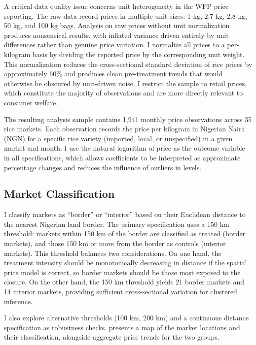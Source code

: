\documentclass[12pt]{article}
\begin{document}
A critical data quality issue concerns unit heterogeneity in the WFP price reporting. The raw data record prices in multiple unit sizes: 1 kg, 2.7 kg, 2.8 kg, 50 kg, and 100 kg bags. Analysis on raw prices without unit normalization produces nonsensical results, with inflated variance driven entirely by unit differences rather than genuine price variation. I normalize all prices to a per-kilogram basis by dividing the reported price by the corresponding unit weight. This normalization reduces the cross-sectional standard deviation of rice prices by approximately 60\% and produces clean pre-treatment trends that would otherwise be obscured by unit-driven noise. I restrict the sample to retail prices, which constitute the majority of observations and are more directly relevant to consumer welfare.

The resulting analysis sample contains 1,941 monthly price observations across 35 rice markets. Each observation records the price per kilogram in Nigerian Naira (NGN) for a specific rice variety (imported, local, or unspecified) in a given market and month. I use the natural logarithm of price as the outcome variable in all specifications, which allows coefficients to be interpreted as approximate percentage changes and reduces the influence of outliers in levels.

\subsection{Market Classification}

I classify markets as ``border'' or ``interior'' based on their Euclidean distance to the nearest Nigerian land border. The primary specification uses a 150 km threshold: markets within 150 km of the border are classified as treated (border markets), and those 150 km or more from the border as controls (interior markets). This threshold balances two considerations. On one hand, the treatment intensity should be monotonically decreasing in distance if the spatial price model is correct, so border markets should be those most exposed to the closure. On the other hand, the 150 km threshold yields 21 border markets and 14 interior markets, providing sufficient cross-sectional variation for clustered inference.

I also explore alternative thresholds (100 km, 200 km) and a continuous distance specification as robustness checks.  presents a map of the market locations and their classification, alongside aggregate price trends for the two groups.
\end{document}
